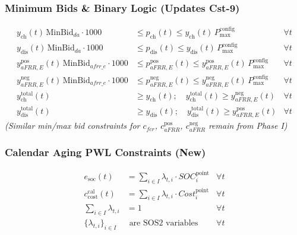 \documentclass[11pt, a4paper]{article}
\begin{document}
\subsubsection{Minimum Bids \& Binary Logic (Updates Cst-9)}
\begin{align}
    y_{\mathrm{ch}}(t)\,\text{MinBid}_{da} \cdot 1000 &\le p_{\mathrm{ch}}(t) \le y_{\mathrm{ch}}(t)\,P^{\mathrm{config}}_{\max} & \forall t \\
    y_{\mathrm{dis}}(t)\,\text{MinBid}_{da} \cdot 1000 &\le p_{\mathrm{dis}}(t) \le y_{\mathrm{dis}}(t)\,P^{\mathrm{config}}_{\max} & \forall t \\
    y^{\mathrm{pos}}_{aFRR,E}(t)\,\text{MinBid}_{afrr\_e} \cdot 1000 &\le p^{\mathrm{pos}}_{aFRR,E}(t) \le y^{\mathrm{pos}}_{aFRR,E}(t)\,P^{\mathrm{config}}_{\max} & \forall t \\
    y^{\mathrm{neg}}_{aFRR,E}(t)\,\text{MinBid}_{afrr\_e} \cdot 1000 &\le p^{\mathrm{neg}}_{aFRR,E}(t) \le y^{\mathrm{neg}}_{aFRR,E}(t)\,P^{\mathrm{config}}_{\max} & \forall t \\
    y^{\mathrm{total}}_{\mathrm{ch}}(t) &\ge y_{\mathrm{ch}}(t); \quad y^{\mathrm{total}}_{\mathrm{ch}}(t) \ge y^{\mathrm{neg}}_{aFRR,E}(t) & \forall t \\
    y^{\mathrm{total}}_{\mathrm{dis}}(t) &\ge y_{\mathrm{dis}}(t); \quad y^{\mathrm{total}}_{\mathrm{dis}}(t) \ge y^{\mathrm{pos}}_{aFRR,E}(t) & \forall t
\end{align}
\textit{(Similar min/max bid constraints for $c_{fcr}$, $c^{\mathrm{pos}}_{aFRR}$, $c^{\mathrm{neg}}_{aFRR}$ remain from Phase I)}

\subsubsection{Calendar Aging PWL Constraints (New)}
\begin{align}
    e_{\mathrm{soc}}(t) &= \sum_{i \in I} \lambda_{t,i} \cdot SOC^{\mathrm{point}}_i & \forall t \\
    c^{\mathrm{cal}}_{\mathrm{cost}}(t) &= \sum_{i \in I} \lambda_{t,i} \cdot Cost^{\mathrm{point}}_i & \forall t \\
    \sum_{i \in I} \lambda_{t,i} &= 1 & \forall t \\
    \{\lambda_{t,i}\}_{i \in I} &\text{ are SOS2 variables} & \forall t
\end{align}
\end{document}
